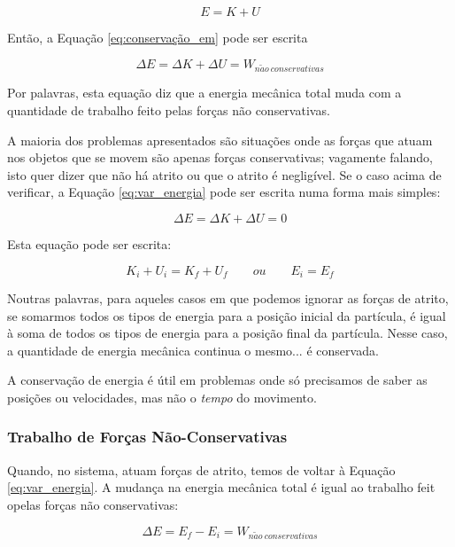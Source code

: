 \begin{equation}
    E=K+U
\end{equation}

Então, a Equação \ref{eq:conservação_em} pode ser escrita

\begin{equation}\label{eq:var_energia}
    \Delta E=\Delta K + \Delta U=W_{n\tilde{a}o\ conservativas}
\end{equation}

Por palavras, esta equação diz que a energia mecânica total muda com a quantidade de trabalho feito pelas forças não conservativas.

A maioria dos problemas apresentados são situações onde as forças que atuam nos objetos que se movem são apenas forças conservativas; vagamente falando, isto quer dizer que não há atrito ou que o atrito é negligível.
Se o caso acima de verificar, a Equação \ref{eq:var_energia} pode ser escrita numa forma mais simples:

\begin{equation}
    \Delta E = \Delta K + \Delta U = 0
\end{equation}

Esta equação pode ser escrita:

$$
K_i+U_i=K_f+U_f \qquad ou \qquad E_i=E_f
$$

Noutras palavras, para aqueles casos em que podemos ignorar as forças de atrito, se somarmos todos os tipos de energia para a posição inicial da partícula, é igual à soma de todos os tipos
de energia para a posição final da partícula. Nesse caso, a quantidade de energia mecânica continua o mesmo... é conservada.

A conservação de energia é útil em problemas onde só precisamos de saber as posições ou velocidades, mas não o \emph{tempo} do movimento.

\subsubsection{Trabalho de Forças Não-Conservativas}
Quando, no sistema, atuam forças de atrito, temos de voltar à Equação \ref{eq:var_energia}. A mudança na energia mecânica total é igual ao trabalho feit opelas forças não conservativas:

\begin{equation}
    \Delta E=E_f-E_i=W_{n\tilde{a}o\ conservativas}
\end{equation}